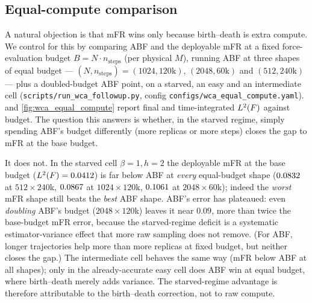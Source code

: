 \subsection{Equal-compute comparison}
\label{sec:wca_equal_compute}
A natural objection is that mFR wins only because birth--death is extra compute.
We control for this by comparing ABF and the deployable mFR at a fixed
force-evaluation budget $B=N\cdot n_{\mathrm{steps}}$ (per physical $M$), running
ABF at three shapes of equal budget --- $(N,n_{\mathrm{steps}})=(1024,120\text{k})$,
$(2048,60\text{k})$ and $(512,240\text{k})$ --- plus a doubled-budget ABF point,
on a starved, an easy and an intermediate cell
(\texttt{scripts/run\_wca\_followup.py}, config
\texttt{configs/wca\_equal\_compute.yaml}).  and
\cref{fig:wca_equal_compute} report final and time-integrated $\Ltwo(F)$ against
budget. The question this answers is whether, in the starved regime, simply
spending ABF's budget differently (more replicas or more steps) closes the gap to
mFR at the base budget.

It does not. In the starved cell $\beta=1,h=2$ the deployable mFR at the base
budget ($L^2(F)=0.0412$) is far below ABF at \emph{every} equal-budget
shape ($0.0832$ at $512\!\times\!240$k, $0.0867$ at
$1024\!\times\!120$k, $0.1061$ at $2048\!\times\!60$k); indeed the
\emph{worst} mFR shape still beats the \emph{best} ABF shape. ABF's error has
plateaued: even \emph{doubling} ABF's budget ($2048\!\times\!120$k) leaves it near
$0.09$, more than twice the base-budget mFR error, because the starved-regime
deficit is a systematic estimator-variance effect that more raw sampling does not
remove. (For ABF, longer trajectories help more than more replicas at fixed
budget, but neither closes the gap.) The intermediate cell behaves the same way
(mFR below ABF at all shapes); only in the already-accurate easy cell does ABF win
at equal budget, where birth--death merely adds variance. The starved-regime
advantage is therefore attributable to the birth--death correction, not to raw
compute.

\begin{table}[t]
  \centering
  \small
  \caption{Equal-compute comparison at fixed force-evaluation budget
    $B=N\cdot n_{\mathrm{steps}}$. For a starved ($\beta{=}1,h{=}2$), an
    intermediate ($\beta{=}2,h{=}6$) and an easy ($\beta{=}4,h{=}1$) cell, ABF is
    run at three equal-budget shapes (plus a doubled-budget point) and compared with
    deployable mFR at the base budget by final $\Ltwo(F)$ (median over seeds). In
    the starved and intermediate cells the worst mFR shape still beats the best ABF
    shape; only in the easy cell does ABF win.}
  \label{tab:wca_equal_compute}
  
\end{table}

